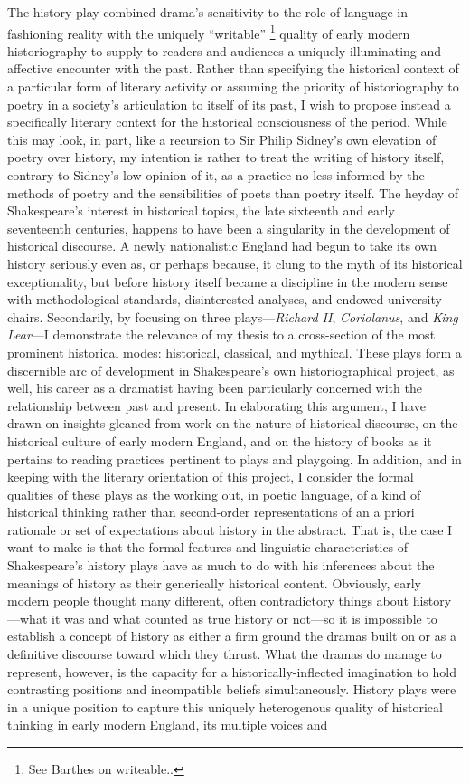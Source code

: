 The history play combined drama's sensitivity to the role of language in fashioning reality with the uniquely ``writable'' \footnote{See Barthes on writeable.\nocite{Barthes}.} quality of early modern historiography to supply to readers and audiences a uniquely illuminating and affective encounter with the past. Rather than specifying the historical context of a particular form of literary activity or assuming the priority of historiography to poetry in a society's articulation to itself of its past, I wish to propose instead a specifically literary context for the historical consciousness of the period. While this may look, in part, like a recursion to Sir Philip Sidney's own elevation of poetry over history, my intention is rather to treat the writing of history itself, contrary to Sidney's low opinion of it, as a practice no less informed by the methods of poetry and the sensibilities of poets than poetry itself. The heyday of Shakespeare's interest in historical topics, the late sixteenth and early seventeenth centuries, happens to have been a singularity in the development of historical discourse. A newly nationalistic England had begun to take its own history seriously even as, or perhaps because, it clung to the myth of its historical exceptionality, but before history itself became a discipline in the modern sense with methodological standards, disinterested analyses, and endowed university chairs. Secondarily, by focusing on three plays---\emph{Richard II}, \emph{Coriolanus}, and \emph{King Lear}---I demonstrate the relevance of my thesis to a cross-section of the most prominent historical modes: historical, classical, and mythical. These plays form a discernible arc of development in Shakespeare's own historiographical project, as well, his career as a dramatist having been particularly concerned with the relationship between past and present. In elaborating this argument, I have drawn on insights gleaned from work on the nature of historical discourse, on the historical culture of early modern England, and on the history of books as it pertains to reading practices pertinent to plays and playgoing. In addition, and in keeping with the literary orientation of this project, I consider the formal qualities of these plays as the working out, in poetic language, of a kind of historical thinking rather than second-order representations of an a priori rationale or set of expectations about history in the abstract. That is, the case I want to make is that the formal features and linguistic characteristics of Shakespeare's history plays have as much to do with his inferences about the meanings of history as their generically historical content. Obviously, early modern people thought many different, often contradictory things about history---what it was and what counted as true history or not---so it is impossible to establish a concept of history as either a firm ground the dramas built on or as a definitive discourse toward which they thrust. What the dramas do manage to represent, however, is the capacity for a historically-inflected imagination to hold contrasting positions and incompatible beliefs simultaneously. History plays were in a unique position to capture this uniquely heterogenous quality of historical thinking in early modern England, its multiple voices and 